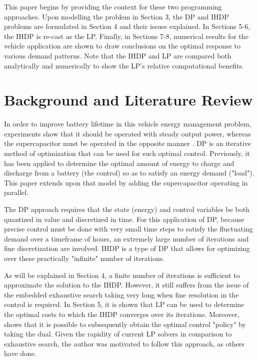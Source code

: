 \documentclass[conference]{IEEEtran}
\begin{document}
This paper begins by providing the context for these two programming approaches. Upon modelling the problem in Section 3, the DP and IHDP problems are formulated in Section 4 and their issues explained. In Sections 5-6, the IHDP is re-cast as the LP. Finally, in Sections 7-8, numerical results for the vehicle application are shown to draw conclusions on the optimal response to various demand patterns. Note that the IHDP and LP are compared both analytically and numerically to show the LP's relative computational benefits.


\section{Background and Literature Review}
In order to improve battery lifetime in this vehicle energy management problem, experiments \cite{thounthong2009energy} show that it should be operated with steady output power, whereas the supercapacitor must be operated in the opposite manner \cite{thounthong2009energy}. DP is an iterative method of optimization that can be used for such optimal control. Previously\cite{thounthong2009energy}, it has been applied to determine the optimal amount of energy to charge and discharge from a battery (the control) so as to satisfy an energy demand ("load"). This paper extends upon that model by adding the supercapacitor operating in parallel.

The DP approach requires that the state (energy) and control variables be both quantized in value and discretized in time. For this application of DP, because precise control must be done with very small time steps to satisfy the fluctuating demand over a timeframe of hours, an extremely large number of iterations and fine discretization are involved.\cite{bertsekas1995dynamic} IHDP is a type of DP that allows for optimizing over these practically "infinite" number of iterations.

As will be explained in Section 4, a finite number of iterations is sufficient to approximate the solution to the IHDP.\cite{bertsekas1995dynamic} However, it still suffers from the issue of the embedded exhaustive search taking very long when fine resolution in the control is required. In Section 5, it is shown that LP can be used to determine the optimal costs to which the IHDP converges over its iterations.\cite{bertsekas1995dynamic} Moreover, \cite{4220813} shows that it is possible to subsequently obtain the optimal control "policy" by taking the dual. Given the rapidity of current LP solvers in comparison to exhaustive search, the author was motivated to follow this approach, as others have done.
\end{document}
